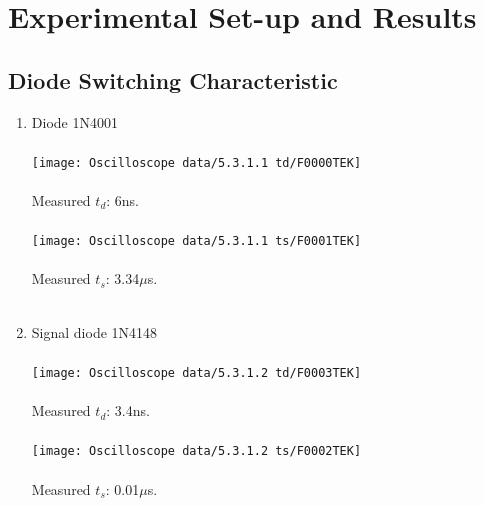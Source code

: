 \documentclass{article}
\begin{document}
		\section{Experimental Set-up and Results}
			\subsection{Diode Switching Characteristic}
			\begin{enumerate}
				\item Diode 1N4001\\\\
				\texttt{[image: Oscilloscope data/5.3.1.1 td/F0000TEK]}\\\\
				Measured \(t_d\): 6ns.\\\\
				\texttt{[image: Oscilloscope data/5.3.1.1 ts/F0001TEK]}\\\\ 
				Measured \(t_s\): 3.34\(\mu\)s.\\\\
				\item Signal diode 1N4148\\\\
				\texttt{[image: Oscilloscope data/5.3.1.2 td/F0003TEK]}\\\\
				Measured \(t_d\): 3.4ns.\\\\
				\texttt{[image: Oscilloscope data/5.3.1.2 ts/F0002TEK]}\\\\ 
				Measured \(t_s\): 0.01\(\mu\)s.\\\\
			\end{enumerate}
\end{document}
